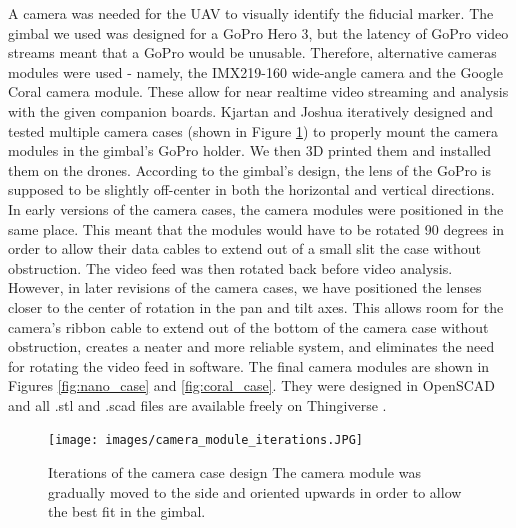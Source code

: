 A camera was needed for the UAV to visually identify the fiducial marker. The gimbal we used was designed for a GoPro Hero 3, but the latency of GoPro video streams meant that a GoPro would be unusable. Therefore, alternative cameras modules were used - namely, the IMX219-160 wide-angle camera and the Google Coral camera module. These allow for near realtime video streaming and analysis with the given companion boards. Kjartan and Joshua iteratively designed and tested multiple camera cases (shown in Figure \ref{fig:camera_case_iterations}) to properly mount the camera modules in the gimbal's GoPro holder. We then 3D printed them and installed them on the drones. According to the gimbal's design, the lens of the GoPro is supposed to be slightly off-center in both the horizontal and vertical directions. In early versions of the camera cases, the camera modules were positioned in the same place. This meant that the modules would have to be rotated 90 degrees in order to allow their data cables to extend out of a small slit the case without obstruction. The video feed was then rotated back before video analysis. However, in later revisions of the camera cases, we have positioned the lenses closer to the center of rotation in the pan and tilt axes. This allows room for the camera's ribbon cable to extend out of the bottom of the camera case without obstruction, creates a neater and more reliable system, and eliminates the need for rotating the video feed in software. The final camera modules are shown in Figures \ref{fig:nano_case} and \ref{fig:coral_case}. They were designed in OpenSCAD and all .stl and .scad files are available freely on Thingiverse \cite{camera_thingiverse}.

\begin{figure}
    \centering
    \texttt{[image: images/camera\_module\_iterations.JPG]}
    \caption{Iterations of the camera case design The camera module was gradually moved to the side and oriented upwards in order to allow the best fit in the gimbal.}
    \label{fig:camera_case_iterations}
\end{figure}

